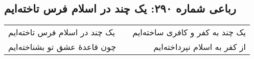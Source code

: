 \begin{center}
\section*{رباعی شماره ۲۹۰: یک چند در اسلام فرس تاخته‌ایم}
\label{sec:sh290}
\begin{longtable}{l p{0.5cm} r}
یک چند در اسلام فرس تاخته‌ایم
&&
یک چند به کفر و کافری ساخته‌ایم
\\
چون قاعدهٔ عشق تو بشناخته‌ایم
&&
از کفر به اسلام نپرداخته‌ایم
\\
\end{longtable}
\end{center}

